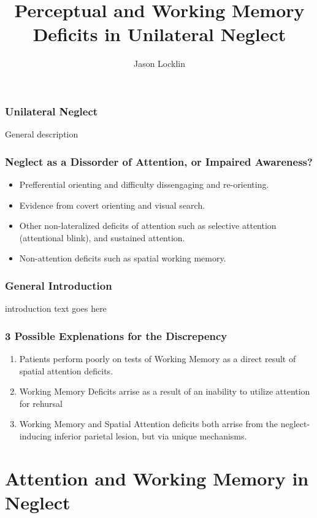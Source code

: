 \documentclass{beamer}
\title[Perception and Working Memory in Neglect]{Perceptual and Working Memory Deficits in Unilateral Neglect}
\subtitle{}
\author{Jason Locklin}
\institute[University of Waterloo]
{
	Department of Psychology\\
	University of Waterloo\\
	\bigskip
	Supervisor: Dr. James Danckert
}
\date[August 6, 2015]
{}%
\begin{document}
\frame{\titlepage}

\section*{}
\begin{frame}
	\frametitle{Unilateral Neglect}
  General description
\end{frame}


\begin{frame}
	\frametitle{Neglect as a Dissorder of Attention, or Impaired Awareness?}
	\begin{itemize}
		\item	Prefferential orienting and difficulty dissengaging and re-orienting.
		\item Evidence from covert orienting and visual search.
		\item Other non-lateralized deficits of attention such as selective attention (attentional blink), and sustained attention.
		\item Non-attention deficits such as spatial working memory.
	\end{itemize}
\end{frame}


\begin{frame}
	\frametitle{General Introduction}
	introduction text goes here
\end{frame}

\begin{frame}
\frametitle{3 Possible Explenations for the Discrepency}
\begin{enumerate}
\item Patients perform poorly on tests of Working Memory as a direct result of spatial attention deficits.
\item Working Memory Deficits arrise as a result of an inability to utilize attention for rehursal
\item Working Memory and Spatial Attention deficits both arrise from the neglect-inducing inferior parietal lesion, but via unique mechanisms.
\end{enumerate}
\end{frame}



\section[Attention and WM]{Attention and Working Memory in Neglect}
\end{document}
